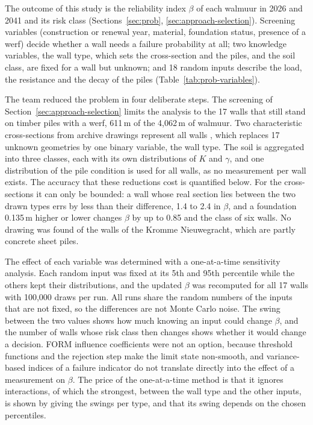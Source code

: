 The outcome of this study is the reliability index $\beta$ of each walmuur in
2026 and 2041 and its risk class (Sections~\ref{sec:prob},
\ref{sec:approach-selection}). Screening variables (construction or renewal
year, material, foundation status, presence of a werf) decide whether a wall
needs a failure probability at all; two knowledge variables, the wall type,
which sets the cross-section and the piles, and the soil class, are fixed for a
wall but unknown; and 18 random inputs describe the load, the resistance and
the decay of the piles (Table~\ref{tab:prob-variables}).

The team reduced the problem in four deliberate steps. The screening of
Section~\ref{sec:approach-selection} limits the analysis to the 17 walls that
still stand on timber piles with a werf, 611\,m of the 4{,}062\,m of walmuur.
Two characteristic cross-sections from archive drawings represent all walls
\parencite{ibu2010,erfgoed156}, which replaces 17 unknown geometries by one
binary variable, the wall type. The soil is aggregated into three classes, each
with its own distributions of $K$ and $\gamma$, and one distribution of the
pile condition is used for all walls, as no measurement per wall exists. The
accuracy that these reductions cost is quantified below. For the
cross-sections it can only be bounded: a wall whose real section lies between
the two drawn types errs by less than their difference, 1.4 to 2.4 in $\beta$,
and a foundation 0.135\,m higher or lower changes $\beta$ by up to 0.85 and the
class of six walls. No drawing was found of the walls of the Kromme
Nieuwegracht, which are partly concrete sheet piles.

The effect of each variable was determined with a one-at-a-time sensitivity
analysis. Each random input was fixed at its 5th and 95th percentile while the
others kept their distributions, and the updated $\beta$ was recomputed for
all 17 walls with 100{,}000 draws per run. All runs share the random numbers of
the inputs that are not fixed, so the differences are not Monte Carlo noise.
The swing between the two values shows how much knowing an input could change
$\beta$, and the number of walls whose risk class then changes shows whether it
would change a decision. FORM influence coefficients were not an option,
because threshold functions and the rejection step make the limit state
non-smooth, and variance-based indices of a failure indicator do not
translate directly into the effect of a measurement on $\beta$. The price of
the one-at-a-time method is that it ignores interactions, of which the
strongest, between the wall type and the other inputs, is shown by giving the
swings per type, and that its swing depends on the chosen percentiles.

